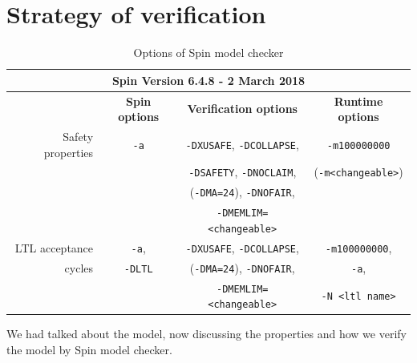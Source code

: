 \section{Strategy of verification}
\begin{table}
\caption{Options of Spin model checker}
\label{tab:spinv}
\begin{tabular}{rccc}
\toprule
\multicolumn{4}{c}{Spin Version 6.4.8 - 2 March 2018} \\
\midrule
 & \textbf{Spin options} & \textbf{Verification options} & \textbf{Runtime options} \\
 \cmidrule{2-4}
Safety properties & \texttt{-a} & \texttt{-DXUSAFE}, \texttt{-DCOLLAPSE}, & \texttt{-m100000000} \\
& & \texttt{-DSAFETY}, \texttt{-DNOCLAIM}, & (\texttt{-m<changeable>}) \\
& & (\texttt{-DMA=24}), \texttt{-DNOFAIR}, & \\
& & \texttt{-DMEMLIM=<changeable>} & \\
\cmidrule{2-4}
LTL acceptance & \texttt{-a}, & \texttt{-DXUSAFE}, \texttt{-DCOLLAPSE}, & \texttt{-m100000000}, \\
cycles & \texttt{-DLTL} & (\texttt{-DMA=24}), \texttt{-DNOFAIR}, & \texttt{-a}, \\
& & \texttt{-DMEMLIM=<changeable>} & \texttt{-N <ltl name>} \\
\bottomrule
\end{tabular}
\end{table}
We had talked about the model, now discussing the properties and how we verify the model by Spin model checker.

